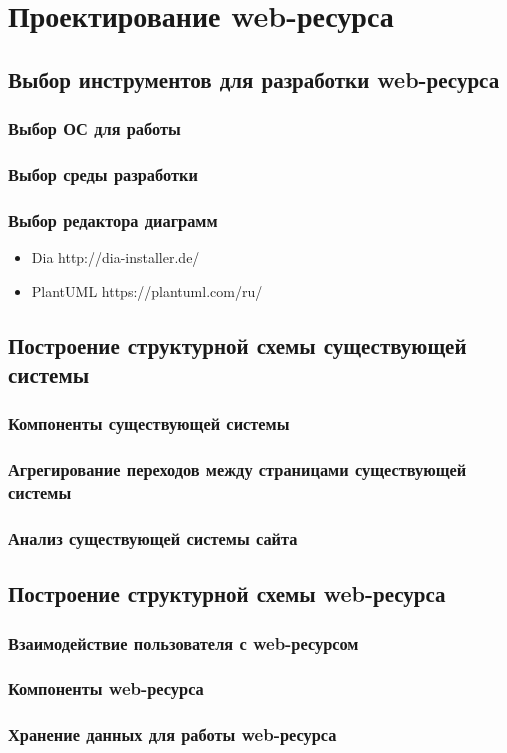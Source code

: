 \section{Проектирование web-ресурса}
    \subsection{Выбор инструментов для разработки web-ресурса}
        \subsubsection{Выбор ОС для работы}
        \subsubsection{Выбор среды разработки}
            
        \subsubsection{Выбор редактора диаграмм}
            \begin{itemize}
                \item Dia   http://dia-installer.de/
                \item PlantUML  https://plantuml.com/ru/
            \end{itemize}
        
    \subsection{Построение структурной схемы существующей системы}
        \subsubsection{Компоненты существующей системы}
        \subsubsection{Агрегирование переходов между страницами существующей системы}
        \subsubsection{Анализ существующей системы сайта}

    \subsection{Построение структурной схемы web-ресурса}
        \subsubsection{Взаимодействие пользователя с web-ресурсом}
        \subsubsection{Компоненты web-ресурса}
        \subsubsection{Хранение данных для работы web-ресурса}

\clearpage
